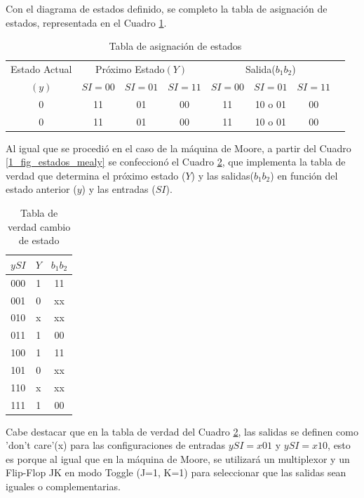 \documentclass[10pt,a4paper]{article}
\begin{document}
Con el diagrama de estados definido, se completo la tabla de asignación de estados, representada en el Cuadro \ref{1_tabla_mealy_estados}.

\begin{table}[ht]
	\centering
	\begin{tabular}{c|c|c|c|c|c|c|c}
	Estado Actual & \multicolumn{3}{c|}{Próximo Estado$(Y)$} & \multicolumn{3}{c|}{Salida($b_1b_2$)}\\
	\cline{2-7}
	$(y)$ & $SI=00$ & $SI=01$ & $SI=11$ & $SI=00$ & $SI=01$ & $SI=11$ \\
	\hline
	0 & 11 & 01 & 00 & 11 & 10 o 01 & 00 \\
	0 & 11 & 01 & 00 & 11 & 10 o 01 & 00\\
	\end{tabular}
	\caption{Tabla de asignación de estados} \label{1_tabla_mealy_estados}
\end{table}

Al igual que se procedió en el caso de la máquina de Moore, a partir del Cuadro \ref{1_fig_estados_mealy} se confeccionó el Cuadro \ref{1_tabla_verdad_mealy}, que implementa la tabla de verdad que determina el próximo estado ($Y$) y las salidas($b_1b_2$) en función del estado anterior ($y$) y las entradas ($SI$). 

\begin{table}[H]
	\centering
	\begin{tabular}{c|c|c}
	$ySI$ & $Y$ & $b_1b_2$ \\ 
	\hline 
	000 & 1 & 11  \\ 
	\hline 
	001 & 0 & xx  \\ 
	\hline 
	010 & x & xx  \\ 
	\hline 
	011 & 1 & 00  \\ 
	\hline 
	100 & 1 & 11  \\ 
	\hline 
	101 & 0 & xx  \\ 
	\hline 
	110 & x & xx  \\ 
	\hline 
	111 & 1 & 00  \\ 
	\end{tabular} 
	\caption{Tabla de verdad cambio de estado} \label{1_tabla_verdad_mealy}
\end{table}

Cabe destacar que en la tabla de verdad del Cuadro \ref{1_tabla_verdad_mealy}, las salidas se definen como 'don't care'(x) para las configuraciones de entradas $ySI = x01$ y $ySI = x10$, esto es porque al igual que en la máquina de Moore, se utilizará un multiplexor y un Flip-Flop JK en modo Toggle (J=1, K=1) para seleccionar que las salidas sean iguales o complementarias.
\end{document}
